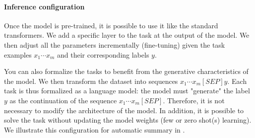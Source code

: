 




\paragraph{Inference configuration} Once the model is pre-trained, it is possible to use it like the standard transformers. We add a specific layer to the task at the output of the model. We then adjust all the parameters incrementally (fine-tuning) given the task examples $x_1 \cdots x_m$ and their corresponding labels $y$. 

You can also formalize the tasks to benefit from the generative characteristics of the model. We then transform the dataset into sequences $x_1 \cdots x_m [SEP] y$. Each task is thus formalized as a language model: the model must "generate" the label $y$ as the continuation of the sequence $x_1 \cdots x_m [SEP]$. Therefore, it is not necessary to modify the architecture of the model. In addition, it is possible to solve the task without updating the model weights (few or zero shot(s) learning). 
We illustrate this configuration for automatic summary in .


